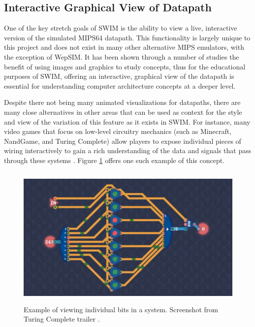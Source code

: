 \documentclass[
    paper=letter,
    parskip=half,
    fontsize=12pt,
    titlepage=firstiscover,
    toc=bibliography,
    numbers=endperiod
]{scrartcl}
\begin{document}
\subsection{Interactive Graphical View of Datapath}
\label{subsec:datapath-visual-representation}


One of the key stretch goals of SWIM is the ability to view a live,
interactive version of the simulated MIPS64 datapath. This functionality
is largely unique to this project and does not exist in many other
alternative MIPS emulators, with the exception of WepSIM. It has been
shown through a number of studies \cite{presmeg2006, carney2002} the
benefit of using images and graphics to study concepts, thus for the
educational purposes of SWIM, offering an interactive, graphical view of
the datapath is essential for understanding computer architecture
concepts at a deeper level.

Despite there not being many animated visualizations for datapaths,
there are many close alternatives in other areas that can be used as
context for the style and view of the variation of this feature as it
exists in SWIM. For instance, many video games that focus on low-level
circuitry mechanics (such as Minecraft, NandGame, and Turing Complete)
allow players to expose individual pieces of wiring interactively to
gain a rich understanding of the data and signals that pass through
these systems \cite{minecraft, nandgame, turing-complete}. Figure
\ref{fig:turing-complete} offers one such example of this concept.

\begin{figure}[H]
    \includegraphics[height=7cm]{turing-complete}
    \caption{Example of viewing individual bits in a system. Screenshot from Turing Complete trailer \protect\cite{turing-complete-trailer}.}
    \label{fig:turing-complete}
\end{figure}
\end{document}

